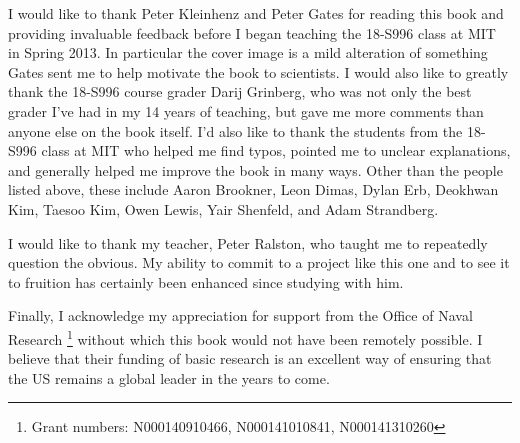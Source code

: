 \documentclass[CT4S-EN-RU]{subfiles}
\begin{document}
\begin{blockRUS}
\end{blockRUS}

\begin{blockENG}
I would like to thank Peter Kleinhenz and Peter Gates for reading this book and providing invaluable feedback before I began teaching the 18-S996 class at MIT in Spring 2013. In particular the cover image is a mild alteration of something Gates sent me to help motivate the book to scientists. I would also like to greatly thank the 18-S996 course grader Darij Grinberg, who was not only the best grader I've had in my 14 years of teaching, but gave me more comments than anyone else on the book itself. I'd also like to thank the students from the 18-S996 class at MIT who helped me find typos, pointed me to unclear explanations, and generally helped me improve the book in many ways. Other than the people listed above, these include Aaron Brookner, Leon Dimas, Dylan Erb, Deokhwan Kim, Taesoo Kim, Owen Lewis, Yair Shenfeld, and Adam Strandberg.
\end{blockENG}

\begin{blockRUS}
\end{blockRUS}

\begin{blockENG}
I would like to thank my teacher, Peter Ralston, who taught me to repeatedly question the obvious. My ability to commit to a project like this one and to see it to fruition has certainly been enhanced since studying with him.
\end{blockENG}

\begin{blockRUS}
\end{blockRUS}

\begin{blockENG}
Finally, I acknowledge my appreciation for support from the Office of Naval Research%
\footnote{Grant numbers: N000140910466, N000141010841, N000141310260}
without which this book would not have been remotely possible. I believe that their funding of basic research is an excellent way of ensuring that the US remains a global leader in the years to come.
\end{blockENG}

\begin{blockRUS}
\end{blockRUS}
\end{document}
